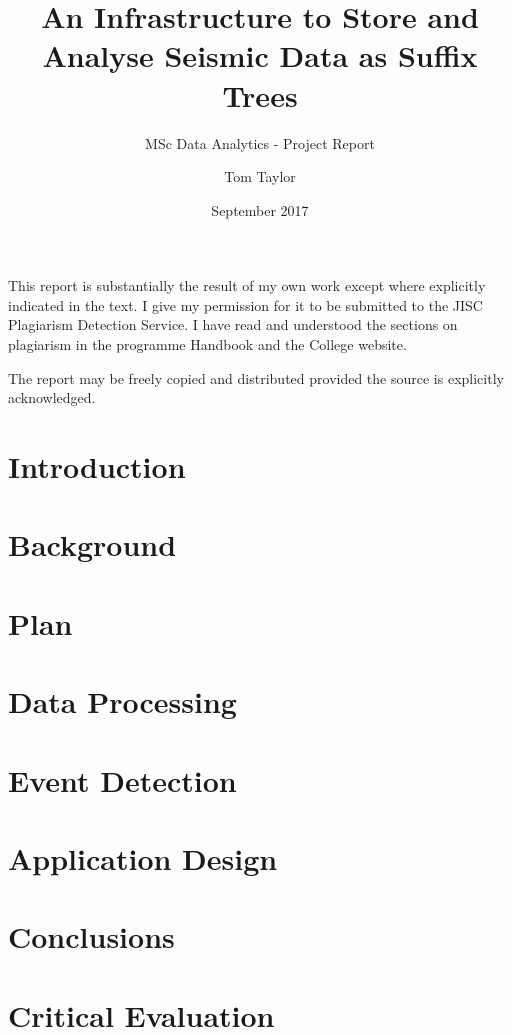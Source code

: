 \documentclass[11pt, a4paper]{scrartcl}
\title{\vspace{-3.0cm}An Infrastructure to Store and Analyse Seismic Data as Suffix Trees}
\subtitle{MSc Data Analytics - Project Report}
\date{September 2017}
\author{Tom Taylor}
\begin{document}
	\maketitle
\begin{itshape}
		\noindent This report is substantially the result of my own work except where explicitly indicated in the text. I give my permission for it to be submitted to the JISC Plagiarism Detection Service. I have read and understood the sections on plagiarism in the programme Handbook and the College website.
		
		\noindent The report may be freely copied and distributed provided the source is explicitly acknowledged.
\end{itshape}
\tableofcontents
\newpage

\section{Introduction}


\section{Background}




\section{Plan}


\section{Data Processing}




\section{Event Detection}


\section{Application Design}


\section{Conclusions}

\section{Critical Evaluation}



	
\end{document}

